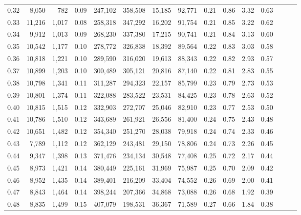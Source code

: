 \begin{tabular}{rrrrrrrrrrrrrrr}
0.32 &   8,050 &    782 &  0.09 &  247,102 &  358,508 &   15,185 &   92,771 &  0.21 &  0.86 &  3.32 &      0.63 \\
0.33 &  11,216 &  1,017 &  0.08 &  258,318 &  347,292 &   16,202 &   91,754 &  0.21 &  0.85 &  3.22 &      0.62 \\
0.34 &   9,912 &  1,013 &  0.09 &  268,230 &  337,380 &   17,215 &   90,741 &  0.21 &  0.84 &  3.13 &      0.60 \\
0.35 &  10,542 &  1,177 &  0.10 &  278,772 &  326,838 &   18,392 &   89,564 &  0.22 &  0.83 &  3.03 &      0.58 \\
0.36 &  10,818 &  1,221 &  0.10 &  289,590 &  316,020 &   19,613 &   88,343 &  0.22 &  0.82 &  2.93 &      0.57 \\
0.37 &  10,899 &  1,203 &  0.10 &  300,489 &  305,121 &   20,816 &   87,140 &  0.22 &  0.81 &  2.83 &      0.55 \\
0.38 &  10,798 &  1,341 &  0.11 &  311,287 &  294,323 &   22,157 &   85,799 &  0.23 &  0.79 &  2.73 &      0.53 \\
0.39 &  10,801 &  1,374 &  0.11 &  322,088 &  283,522 &   23,531 &   84,425 &  0.23 &  0.78 &  2.63 &      0.52 \\
0.40 &  10,815 &  1,515 &  0.12 &  332,903 &  272,707 &   25,046 &   82,910 &  0.23 &  0.77 &  2.53 &      0.50 \\
0.41 &  10,786 &  1,510 &  0.12 &  343,689 &  261,921 &   26,556 &   81,400 &  0.24 &  0.75 &  2.43 &      0.48 \\
0.42 &  10,651 &  1,482 &  0.12 &  354,340 &  251,270 &   28,038 &   79,918 &  0.24 &  0.74 &  2.33 &      0.46 \\
0.43 &   7,789 &  1,112 &  0.12 &  362,129 &  243,481 &   29,150 &   78,806 &  0.24 &  0.73 &  2.26 &      0.45 \\
0.44 &   9,347 &  1,398 &  0.13 &  371,476 &  234,134 &   30,548 &   77,408 &  0.25 &  0.72 &  2.17 &      0.44 \\
0.45 &   8,973 &  1,421 &  0.14 &  380,449 &  225,161 &   31,969 &   75,987 &  0.25 &  0.70 &  2.09 &      0.42 \\
0.46 &   8,952 &  1,435 &  0.14 &  389,401 &  216,209 &   33,404 &   74,552 &  0.26 &  0.69 &  2.00 &      0.41 \\
0.47 &   8,843 &  1,464 &  0.14 &  398,244 &  207,366 &   34,868 &   73,088 &  0.26 &  0.68 &  1.92 &      0.39 \\
0.48 &   8,835 &  1,499 &  0.15 &  407,079 &  198,531 &   36,367 &   71,589 &  0.27 &  0.66 &  1.84 &      0.38 \\

\end{tabular}

